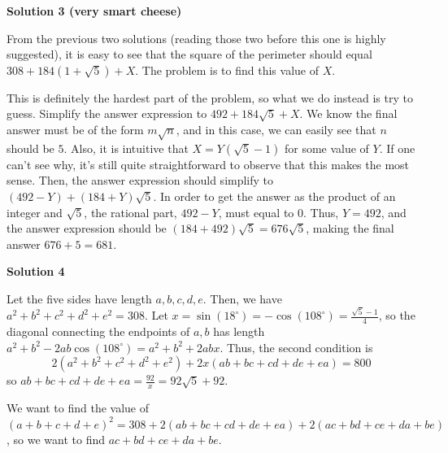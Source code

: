 \begin{enumerate}
\textbf{Solution 3 (very smart cheese)}

From the previous two solutions (reading those two before this one is highly suggested), it is easy to see that the square of the perimeter should equal $308+184(1+\sqrt{5})+X$. The problem is to find this value of $X$.

 This is definitely the hardest part of the problem, so what we do instead is try to guess. Simplify the answer expression to $492+184\sqrt{5}+X$. We know the final answer must be of the form $m\sqrt{n}$, and in this case, we can easily see that $n$ should be $5$. Also, it is intuitive that $X=Y(\sqrt{5}-1)$ for some value of $Y$. If one can't see why, it's still quite straightforward to observe that this makes the most sense. Then, the answer expression should simplify to $(492-Y)+(184+Y)\sqrt{5}$. In order to get the answer as the product of an integer and $\sqrt{5}$, the rational part, $492-Y$, must equal to $0$. Thus, $Y=492$, and the answer expression should be $(184+492)\sqrt{5}=676\sqrt{5}$, making the final answer $676+5=\boxed{681}$.

 



\textbf{Solution 4}

Let the five sides have length $a,b,c,d,e$. Then, we have $a^2+b^2+c^2+d^2+e^2=308$. Let $x=\sin(18^{\circ})=-\cos(108^{\circ})=\frac{\sqrt5-1}{4}$, so the diagonal connecting the endpoints of $a,b$ has length $a^2+b^2-2ab\cos(108^{\circ})=a^2+b^2+2abx$. Thus, the second condition is
 \[2(a^2+b^2+c^2+d^2+e^2)+2x(ab+bc+cd+de+ea)=800\]so $ab+bc+cd+de+ea=\frac{92}{x}=92\sqrt5+92$.

 We want to find the value of $(a+b+c+d+e)^2=308+2(ab+bc+cd+de+ea)+2(ac+bd+ce+da+be)$, so we want to find $ac+bd+ce+da+be$. 


\end{enumerate}
